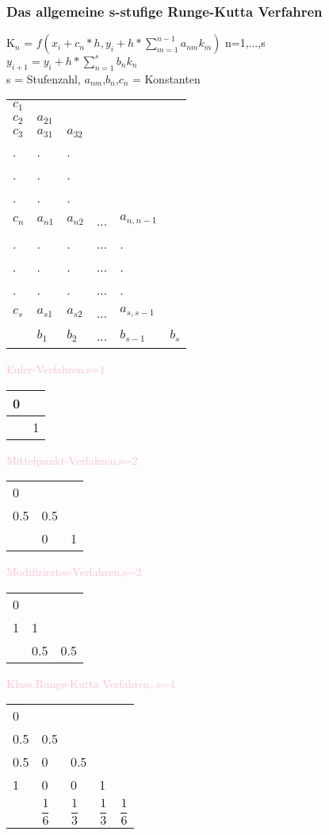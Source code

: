 \documentclass[../ZF_HM2.tex]{subfiles}
\begin{document}
\subsubsection{Das allgemeine s-stufige Runge-Kutta Verfahren}
K\colorbox{pink!30}{$_n$} = $f(x_i + c_n*h,y_i +h*\sum_{m=1}^{n-1}a_{nm}k_m)$ \colorbox{pink!30}{n=1,...,s}\\
$y_{i+1} = y_i +h*\sum_{n=1}^{s}b_nk_n$\\
s = Stufenzahl, $a_{nm}$,$b_n$,$c_n$ = Konstanten

\begin{table} [H]
\begin{tabular}{l|l|l|l|l|l}
$c_1$ & \\
$c_2$ & $a_{21}$\\
$c_3$ & $a_{31}$ & $a_{32}$ \\
.&.&.\\
.&.&.\\
.&.&.\\
$c_n$ & $a_{n1}$& $a_{n2}$&...&$a_{n,n-1}$\\
.&.&.&...&.\\
.&.&.&...&.\\
.&.&.&...&.\\
$c_s$ & $a_{s1}$& $a_{s2}$&...&$a_{s,s-1}$ \\
\hline
&$b_1$&$b_2$&...&$b_{s-1}$&$b_s$
\end{tabular}

\end{table}
\textcolor{pink}{Euler-Verfahren,s=1}
\begin{table} [H]
\begin{tabular}{l|l}
0 & \\
\hline
&1
\end{tabular}
\end{table}
\textcolor{pink}{Mittelpunkt-Verfahren,s=2}
\begin{table} [H]
\begin{tabular}{l|l|l}
0 \\
0.5&0.5\\
\hline
&0&1
\end{tabular}
\end{table}
\textcolor{pink}{Modifiziertes-Verfahren,s=2}
\begin{table} [H]
\begin{tabular}{l|l|l}
0 \\
1&1\\
\hline
&0.5&0.5
\end{tabular}
\end{table}
\textcolor{pink}{Klass.Runge-Kutta Verfahren, s=4}
\begin{table} [H]
\begin{tabular}{l|l|l|l|l}
0 \\
0.5&0.5\\
0.5&0&0.5\\
1&0&0&1\\
\hline
&$\dfrac{1}{6}$&$\dfrac{1}{3}$&$\dfrac{1}{3}$&$\dfrac{1}{6}$
\end{tabular}
\end{table}
\end{document}
